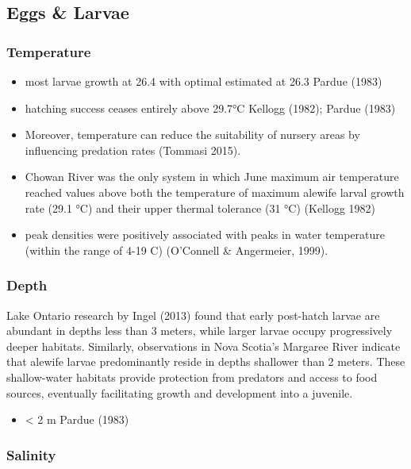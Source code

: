 \documentclass[
]{book}
\providecommand{\tightlist}{%
  \setlength{\itemsep}{0pt}\setlength{\parskip}{0pt}}
\begin{document}
\hypertarget{eggs-larvae}{%
\subsection{Eggs \& Larvae}\label{eggs-larvae}}

\hypertarget{temperature-2}{%
\subsubsection{Temperature}\label{temperature-2}}

\begin{itemize}
\item
  most larvae growth at 26.4 with optimal estimated at 26.3 Pardue (1983)
\item
  hatching success ceases entirely above 29.7°C Kellogg (1982); Pardue (1983)
\item
  Moreover, temperature can reduce the suitability of nursery areas by influencing predation rates (Tommasi 2015).
\item
  Chowan River was the only system in which June maximum air temperature reached values above both the temperature of maximum alewife larval growth rate (29.1 °C) and their upper thermal tolerance (31 °C) (Kellogg 1982)
\item
  peak densities were positively associated with peaks in water temperature (within the range of 4-19 C) (O'Connell \& Angermeier, 1999).
\end{itemize}

\hypertarget{depth-2}{%
\subsubsection{Depth}\label{depth-2}}

Lake Ontario research by Ingel (2013) found that early post-hatch larvae are abundant in depths less than 3 meters, while larger larvae occupy progressively deeper habitats.
Similarly, observations in Nova Scotia's Margaree River indicate that alewife larvae predominantly reside in depths shallower than 2 meters.
These shallow-water habitats provide protection from predators and access to food sources, eventually facilitating growth and development into a juvenile.

\begin{itemize}
\tightlist
\item
  \textless{} 2 m Pardue (1983)
\end{itemize}

\hypertarget{salinity-2}{%
\subsubsection{Salinity}\label{salinity-2}}
\end{document}
